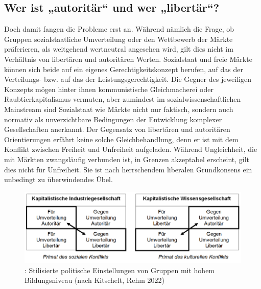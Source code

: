 \begin{multicols*}{2}
\section{Wer ist „autoritär“ und wer „libertär“?}

\noindent Doch damit fangen die Probleme erst an. Während nämlich die Frage, ob Gruppen sozialstaatliche Umverteilung oder den Wettbewerb der Märkte präferieren, als weitgehend wertneutral angesehen wird, gilt dies nicht im Verhältnis von libertären und autoritären Werten. Sozialstaat und freie Märkte können sich beide auf ein eigenes Gerechtigkeitskonzept berufen, auf das der Verteilungs- bzw. auf das der Leistungsgerechtigkeit. Die Gegner des jeweiligen Konzepts mögen hinter ihnen kommunistische Gleichmacherei oder Raubtierkapitalismus vermuten, aber zumindest im sozialwissenschaftlichen Mainstream sind Sozialstaat wie Märkte nicht nur faktisch, sondern auch normativ als unverzichtbare Bedingungen der Entwicklung komplexer Gesellschaften anerkannt. Der Gegensatz von libertären und autoritären Orientierungen erfährt keine solche Gleichbehandlung, denn er ist mit dem Konflikt zwischen Freiheit und Unfreiheit aufgeladen. Während Ungleichheit, die mit Märkten zwangsläufig verbunden ist, in Grenzen akzeptabel erscheint, gilt dies nicht für Unfreiheit. Sie ist nach herrschendem liberalen Grundkonsens ein unbedingt zu überwindendes Übel.

\begin{figure}
    \caption{: Stilisierte politische Einstellungen von Gruppen mit hohem Bildungsniveau (nach Kitschelt, Rehm 2022)}
    \includegraphics[width=\textwidth,height=\textheight,keepaspectratio]{../Bilder/brie2.png} 
\end{figure}


\end{multicols*}
